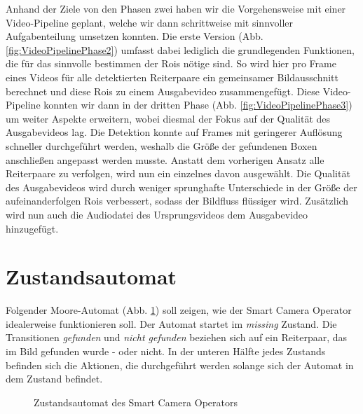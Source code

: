 Anhand der Ziele von den Phasen zwei haben wir die Vorgehensweise mit einer Video-Pipeline geplant, welche wir dann schrittweise mit sinnvoller Aufgabenteilung umsetzen konnten. Die erste Version (Abb. \ref{fig:VideoPipelinePhase2}) umfasst dabei lediglich die grundlegenden Funktionen, die für das sinnvolle bestimmen der Rois nötige sind. So wird hier pro Frame eines Videos für alle detektierten Reiterpaare ein gemeinsamer Bildausschnitt berechnet und diese Rois zu einem Ausgabevideo zusammengefügt.
Diese Video-Pipeline konnten wir dann in der dritten Phase (Abb. \ref{fig:VideoPipelinePhase3}) um weiter Aspekte erweitern, wobei diesmal der Fokus auf der Qualität des Ausgabevideos lag. Die Detektion konnte auf Frames mit geringerer Auflösung schneller durchgeführt werden, weshalb die Größe der gefundenen Boxen anschließen angepasst werden musste. Anstatt dem vorherigen Ansatz alle Reiterpaare zu verfolgen, wird nun ein einzelnes davon ausgewählt. Die Qualität des Ausgabevideos wird durch weniger sprunghafte Unterschiede in der Größe der aufeinanderfolgen Rois verbessert, sodass der Bildfluss flüssiger wird. Zusätzlich wird nun auch die Audiodatei des Ursprungsvideos dem Ausgabevideo hinzugefügt.


\section{Zustandsautomat}

Folgender Moore-Automat (Abb. \ref{fig:MoorAutomat}) soll zeigen, wie der Smart Camera Operator idealerweise funktionieren soll.
Der Automat startet im \emph{missing} Zustand.
Die Transitionen \emph{gefunden} und \emph{nicht gefunden} beziehen sich auf ein Reiterpaar, das im Bild gefunden wurde - oder nicht.
In der unteren Hälfte jedes Zustands befinden sich die Aktionen, die durchgeführt werden solange sich der Automat in dem Zustand befindet.

\begin{figure}[h]
\centering
{}
\caption{Zustandsautomat des Smart Camera Operators}
\label{fig:MoorAutomat}
\end{figure}
